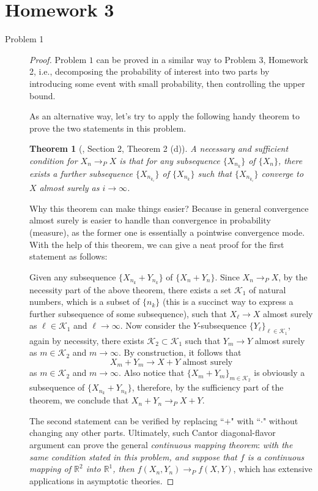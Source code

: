 \documentclass{article}
\theoremstyle{definition}
\theoremstyle{plain}
\newtheorem*{thm}{Theorem}
\theoremstyle{remark}
\begin{document}
\section*{Homework 3}
\begin{description}
\item[Problem 1]
\begin{proof}
Problem $1$ can be proved in a similar way to Problem $3$, Homework 2, i.e., 
decomposing the probability of interest into two parts by introducing some event
with small probability, then controlling the upper bound.

As an alternative way, let's try to apply the following handy theorem to prove 
the two statements in this problem. 
\begin{thm}[\cite{ferguson1996}, Section 2, Theorem 2 (d)]
A necessary and sufficient condition for $X_n \to_P X$ is that for any subsequence $\{X_{n_k}\}$ of $\{X_n\}$, there exists a further subsequence $\{X_{n_{k_i}}\}$ of $\{X_{n_k}\}$ such that $\{X_{n_{k_i}}\}$ converge to $X$ almost surely as $i \to \infty$.
\end{thm} 

Why this theorem can make things easier? Because in general convergence almost surely is easier to handle than convergence in probability (measure), as the former one is essentially a pointwise convergence mode. With the help of this
theorem, we can give a neat proof for the first statement as follows:

Given any subsequence $\{X_{n_k} + Y_{n_k}\}$ of $\{X_n + Y_n\}$. Since $X_n \to_P X$, by the necessity part of the above theorem, there exists a set $\mathscr{K}_1$ of natural numbers, which is a subset of $\{n_k\}$ (this is a succinct way to express a further subsequence of some subsequence), such that $X_\ell \to X$ almost surely as $\ell \in \mathscr{K}_1$ and $\ell \to \infty$. Now consider the $Y$-subsequence $\{Y_\ell\}_{\ell \in \mathscr{K}_1}$, again by necessity, there exists $\mathscr{K}_2 \subset \mathscr{K}_1$ such that $Y_m \to Y$ almost surely as $m \in \mathscr{K}_2$ and $m \to \infty$. By construction, it follows that 
$$X_m + Y_m \to X + Y \text{ almost surely}$$
as $m \in \mathscr{K}_2$ and $m \to \infty$. Also notice that $\{X_m + Y_m\}_{m \in \mathscr{K}_2}$ is obviously a subsequence of $\{X_{n_k} + Y_{n_k}\}$, therefore, by the sufficiency part of the theorem, we conclude that $X_n + Y_n \to_P X + Y$. 

The second statement can be verified by replacing ``$+$" with ``$\cdot$" without changing any other parts. Ultimately, such Cantor diagonal-flavor argument can prove the general \emph{continuous mapping theorem}: \emph{with the same condition stated in this problem, and suppose that $f$ is a continuous mapping of $\mathbb{R}^2$ into $\mathbb{R}^1$, then $f(X_n, Y_n) \to_P f(X, Y)$}, which has extensive applications in asymptotic theories. 
\end{proof}


\end{description}
\end{document}
